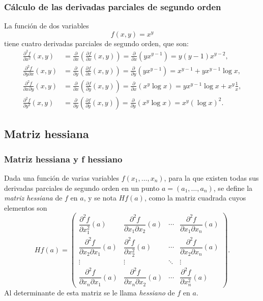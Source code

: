 \begin{frame}
\frametitle{Cálculo de las derivadas parciales de segundo orden}
La función de dos variables
\[f(x,y)=x^y\]
tiene cuatro derivadas parciales de segundo orden, que son:
\begin{align*}
\frac{\partial^2 f}{\partial x^2}(x,y) &=
\frac{\partial}{\partial x}\left(\frac{\partial f}{\partial x}(x,y)\right) =
\frac{\partial}{\partial x}\left(yx^{y-1}\right) =
y(y-1)x^{y-2},\\
\frac{\partial^2 f}{\partial y \partial x}(x,y) &=
\frac{\partial}{\partial y}\left(\frac{\partial f}{\partial x}(x,y)\right) =
\frac{\partial}{\partial y}\left(yx^{y-1}\right) =
x^{y-1}+yx^{y-1}\log x,\\
\frac{\partial^2 f}{\partial x \partial y}(x,y) &=
\frac{\partial}{\partial x}\left(\frac{\partial f}{\partial y}(x,y)\right) =
\frac{\partial}{\partial x}\left(x^y\log x \right) =
yx^{y-1}\log x+x^y\frac{1}{x},\\
\frac{\partial^2 f}{\partial y^2}(x,y) &=
\frac{\partial}{\partial y}\left(\frac{\partial f}{\partial y}(x,y)\right) =
\frac{\partial}{\partial y}\left(x^y\log x \right) =
x^y(\log x)^2.
\end{align*}
\end{frame}


\subsection{Matriz hessiana}
\begin{frame}
\frametitle{Matriz hessiana y f hessiano}
\begin{definicion}
Dada una función de varias variables $f(x_1,\ldots,x_n)$, para la que existen todas sus derivadas parciales de segundo orden en un punto $a=(a_1,\ldots,a_n)$, se define la \emph{matriz hessiana} de $f$ en $a$, y se nota $Hf(a)$, como la matriz cuadrada cuyos elementos son 
\[
Hf(a)=\left(
\begin{array}{cccc}
\dfrac{\partial^2 f}{\partial x_1^2}(a) & 
\dfrac{\partial^2 f}{\partial x_1 \partial x_2}(a) &
\cdots &
\dfrac{\partial^2 f}{\partial x_1 \partial x_n}(a)\\
\dfrac{\partial^2 f}{\partial x_2 \partial x_1}(a) &
\dfrac{\partial^2 f}{\partial x_2^2}(a) & 
\cdots &
\dfrac{\partial^2 f}{\partial x_2 \partial x_n}(a)\\
\vdots & \vdots & \ddots & \vdots \\
\dfrac{\partial^2 f}{\partial x_n \partial x_1}(a) &
\dfrac{\partial^2 f}{\partial x_n \partial x_2}(a) &
\cdots &
\dfrac{\partial^2 f}{\partial x_n^2}(a)
\end{array}
\right).
\]
Al determinante de esta matriz se le llama \emph{hessiano} de $f$ en $a$.
\end{definicion}
\end{frame}



